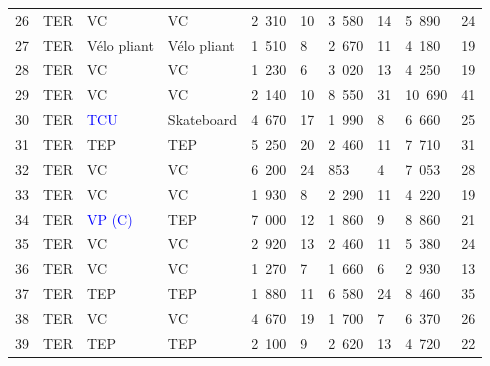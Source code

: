 \begin{longtable}{p{0.7cm}p{1.4cm}p{1.4cm}p{1.6cm}p{0.8cm}p{0.8cm}p{0.8cm}p{0.8cm}p{1.1cm}p{1.1cm}}
    \small{26} & \small{TER} & \small{VC} & \small{VC} & \small{2~310} & \small{10} & \small{3~580} & \small{14} & \small{5~890} & \small{24}\\
    \small{27} & \small{TER} & \small{Vélo pliant} & \small{Vélo pliant} & \small{1~510} & \small{8} & \small{2~670} & \small{11} & \small{4~180} & \small{19}\\
    \small{28} & \small{TER} & \small{VC} & \small{VC} & \small{1~230} & \small{6} & \small{3~020} & \small{13} & \small{4~250} & \small{19}\\
    \small{29} & \small{TER} & \small{VC} & \small{VC} & \small{2~140} & \small{10} & \small{8~550} & \small{31} & \small{10~690} & \small{41}\\
    \small{30} & \small{TER} & \small{\textcolor{blue}{TCU}} & \small{Skateboard} & \small{4~670} & \small{17} & \small{1~990} & \small{8} & \small{6~660} & \small{25}\\
    \small{31} & \small{TER} & \small{TEP} & \small{TEP} & \small{5~250} & \small{20} & \small{2~460} & \small{11} & \small{7~710} & \small{31}\\
    \small{32} & \small{TER} & \small{VC} & \small{VC} & \small{6~200} & \small{24} & \small{853} & \small{4} & \small{7~053} & \small{28}\\
    \small{33} & \small{TER} & \small{VC} & \small{VC} & \small{1~930} & \small{8} & \small{2~290} & \small{11} & \small{4~220} & \small{19}\\
    \small{34} & \small{TER} & \textcolor{blue}{\small{VP (C)}} & \small{TEP} & \small{7~000} & \small{12} & \small{1~860} & \small{9} & \small{8~860} & \small{21} \\
    \small{35} & \small{TER} & \small{VC} & \small{VC} & \small{2~920} & \small{13} & \small{2~460} & \small{11} & \small{5~380} & \small{24} \\
    \small{36} & \small{TER} & \small{VC} & \small{VC} & \small{1~270} & \small{7} & \small{1~660} & \small{6} & \small{2~930} & \small{13} \\
    \small{37} & \small{TER} & \small{TEP} & \small{TEP} & \small{1~880} & \small{11} & \small{6~580} & \small{24} & \small{8~460} & \small{35} \\
    \small{38} & \small{TER} & \small{VC} & \small{VC} & \small{4~670} & \small{19} & \small{1~700} & \small{7} & \small{6~370} & \small{26} \\
    \small{39} & \small{TER} & \small{TEP} & \small{TEP} & \small{2~100} & \small{9} & \small{2~620} & \small{13} & \small{4~720} & \small{22} \\

\end{longtable}
